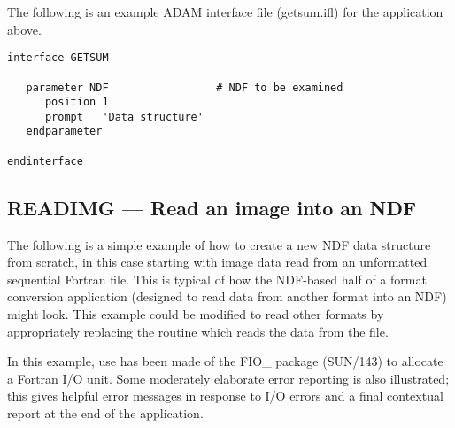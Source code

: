 \documentclass[twoside,11pt]{article}
\newcommand{\xref}[3]{#1}
\newcommand{\xlabel}[1]{}
\begin{document}
The following is an example \xref{ADAM}{sg4}{} interface file
(getsum.ifl) for the application above.

\small
\begin{verbatim}
interface GETSUM

   parameter NDF                 # NDF to be examined
      position 1
      prompt   'Data structure'
   endparameter

endinterface
\end{verbatim}
\normalsize

\newpage
\subsection{\xlabel{READIMG}READIMG --- Read an image into an NDF}

The following is a simple example of how to create a new NDF data
structure from scratch, in this case starting with image data read
from an unformatted sequential Fortran file. This is typical of how
the NDF-based half of a format conversion application (designed to
read data from another format into an NDF) might look. This example
could be modified to read other formats by appropriately replacing the
routine which reads the data from the file.

In this example, use has been made of the FIO\_ package
(\xref{SUN/143}{sun143}{}) to allocate a Fortran I/O unit. Some
moderately elaborate error reporting is also illustrated; this gives
helpful error messages in response to I/O errors and a final
contextual report at the end of the application.
\end{document}
